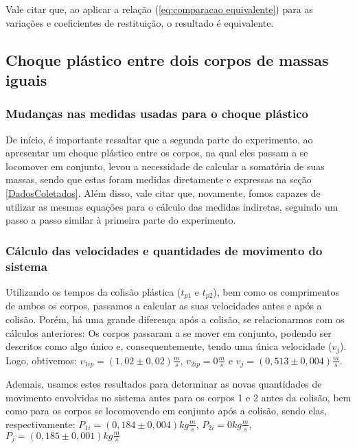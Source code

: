 \documentclass[12pt, twoside]{article}
\begin{document}
    Vale citar que, ao aplicar a relação (\ref{eq:comparacao equivalente}) para as variações e coeficientes de restituição, o resultado é equivalente.


\subsection{Choque plástico entre dois corpos de massas iguais}
\subsubsection{Mudanças nas medidas usadas para o choque plástico}

    De início, é importante ressaltar que a segunda parte do experimento, ao apresentar um choque plástico entre os corpos, na qual eles passam a se locomover em conjunto, levou a necessidade de calcular a somatória de suas massas, sendo que estas foram medidas diretamente e expressas na seção \ref{DadosColetados}. Além disso, vale citar que, novamente, fomos capazes de utilizar as mesmas equações para o cálculo das medidas indiretas, seguindo um passo a passo similar à primeira parte do experimento.

\subsubsection{Cálculo das velocidades e quantidades de movimento do sistema}
\label{velocidadePlastica}

    Utilizando os tempos da colisão plástica ($t_{p1}$ e $t_{p2}$), bem como os comprimentos de ambos os corpos, passamos a calcular as suas velocidades antes e após a colisão. Porém, há uma grande diferença após a colisão, se relacionarmos com os cálculos anteriores: Os corpos passaram a se mover em conjunto, podendo ser descritos como algo único e, consequentemente, tendo uma única velocidade ($v_j$). Logo, obtivemos: $v_{1ip} = (1,02 \pm 0,02)\frac{m}{s}$,  $v_{2ip} = 0\frac{m}{s}$ e $v_j = (0,513 \pm 0,004)\frac{m}{s}$.

    Ademais, usamos estes resultados para determinar as novas quantidades de movimento envolvidas no sistema antes para os corpos 1 e 2 antes da colisão, bem como para os corpos se locomovendo em conjunto após a colisão, sendo elas, respectivamente: $P_{1i} = (0,184 \pm 0,004) kg\frac{m}{s}$, $P_{2i} = 0 kg\frac{m}{s}$, $P_j = (0,185 \pm 0,001) kg\frac{m}{s}$
\end{document}

